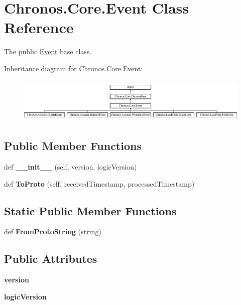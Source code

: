 \hypertarget{classChronos_1_1Core_1_1Event}{}\section{Chronos.\+Core.\+Event Class Reference}
\label{classChronos_1_1Core_1_1Event}


The public \hyperlink{classChronos_1_1Core_1_1Event}{Event} base class.  


Inheritance diagram for Chronos.\+Core.\+Event\+:\begin{figure}[H]
\begin{center}
\leavevmode
\includegraphics[height=2.164251cm]{classChronos_1_1Core_1_1Event}
\end{center}
\end{figure}
\subsection*{Public Member Functions}
\begin{DoxyCompactItemize}
\item 
def {\bfseries \+\_\+\+\_\+init\+\_\+\+\_\+} (self, version, logic\+Version)
\item 
def {\bfseries To\+Proto} (self, received\+Timestamp, processed\+Timestamp)
\end{DoxyCompactItemize}
\subsection*{Static Public Member Functions}
\begin{DoxyCompactItemize}
\item 
def {\bfseries From\+Proto\+String} (string)
\end{DoxyCompactItemize}
\subsection*{Public Attributes}
\begin{DoxyCompactItemize}
\item 
{\bfseries version}
\item 
{\bfseries logic\+Version}
\end{DoxyCompactItemize}


